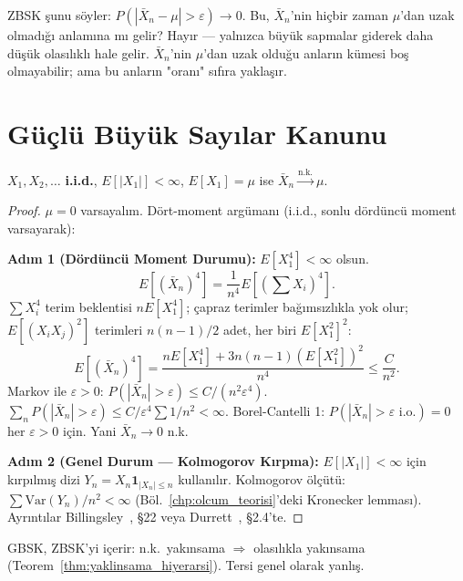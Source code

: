 \begin{kritiksorgu}
ZBSK şunu söyler: $P(|\bar{X}_n - \mu| > \varepsilon) \to 0$.
Bu, $\bar{X}_n$'nin hiçbir zaman $\mu$'dan uzak olmadığı anlamına mı gelir?
Hayır --- yalnızca büyük sapmalar giderek daha düşük olasılıklı hale gelir.
$\bar{X}_n$'nin $\mu$'dan uzak olduğu anların kümesi boş olmayabilir;
ama bu anların "oranı" sıfıra yaklaşır.
\end{kritiksorgu}

\section{Güçlü Büyük Sayılar Kanunu}
\label{sec:gbsk}

\begin{teorem}
\label{thm:gbsk}
$X_1, X_2, \ldots$ \textbf{i.i.d.}, $E[|X_1|] < \infty$, $E[X_1] = \mu$ ise
$\bar{X}_n \xrightarrow{\text{n.k.}} \mu$.
\end{teorem}

\begin{proof}
$\mu = 0$ varsayalım. Dört-moment argümanı (i.i.d., sonlu dördüncü moment varsayarak):

\textbf{Adım 1 (Dördüncü Moment Durumu):} $E[X_1^4] < \infty$ olsun.
\[
  E[(\bar{X}_n)^4] = \frac{1}{n^4} E\!\left[\left(\sum X_i\right)^4\right].
\]
$\sum X_i^4$ terim beklentisi $nE[X_1^4]$; çapraz terimler bağımsızlıkla yok olur;
$E[(X_i X_j)^2]$ terimleri $n(n-1)/2$ adet, her biri $E[X_1^2]^2$:
\[
  E[(\bar{X}_n)^4] = \frac{nE[X_1^4] + 3n(n-1)(E[X_1^2])^2}{n^4} \leq \frac{C}{n^2}.
\]
Markov ile $\varepsilon > 0$: $P(|\bar{X}_n| > \varepsilon) \leq C/(n^2\varepsilon^4)$.
$\sum_n P(|\bar{X}_n| > \varepsilon) \leq C/\varepsilon^4 \sum 1/n^2 < \infty$.
Borel-Cantelli 1: $P(|\bar{X}_n| > \varepsilon \text{ i.o.}) = 0$ her $\varepsilon > 0$ için.
Yani $\bar{X}_n \to 0$ n.k.

\textbf{Adım 2 (Genel Durum --- Kolmogorov Kırpma):}
$E[|X_1|] < \infty$ için kırpılmış dizi $Y_n = X_n \mathbf{1}_{|X_n|\leq n}$ kullanılır.
Kolmogorov ölçütü: $\sum \mathrm{Var}(Y_n)/n^2 < \infty$ (Böl.~\ref{chp:olcum_teorisi}'deki
Kronecker lemması). Ayrıntılar Billingsley~\cite{Billingsley1995}, §22 veya Durrett~\cite{Durrett2019}, §2.4'te.
\end{proof}

\begin{teorem}
\label{thm:gbsk_zbsk}
GBSK, ZBSK'yi içerir: n.k.\ yakınsama $\Rightarrow$ olasılıkla yakınsama
(Teorem~\ref{thm:yaklinsama_hiyerarsi}). Tersi genel olarak yanlış.
\end{teorem}

